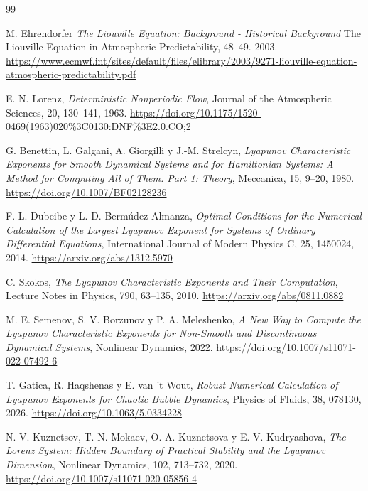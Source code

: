 \documentclass[12pt,a4paper,oneside]{report}
\numberwithin{equation}{chapter}
\begin{document}
\begin{thebibliography}{99}

 M. Ehrendorfer
\emph{The Liouville Equation: Background - Historical Background}
The Liouville Equation in Atmospheric Predictability, 48–49. 2003.
\url{https://www.ecmwf.int/sites/default/files/elibrary/2003/9271-liouville-equation-atmospheric-predictability.pdf}

 E. N. Lorenz, \emph{Deterministic Nonperiodic Flow}, Journal of the Atmospheric Sciences, 20, 130--141, 1963. \url{https://doi.org/10.1175/1520-0469(1963)020%3C0130:DNF%3E2.0.CO;2}

 G. Benettin, L. Galgani, A. Giorgilli y J.-M. Strelcyn, \emph{Lyapunov Characteristic Exponents for Smooth Dynamical Systems and for Hamiltonian Systems: A Method for Computing All of Them. Part 1: Theory}, Meccanica, 15, 9--20, 1980. \url{https://doi.org/10.1007/BF02128236}

 F. L. Dubeibe y L. D. Bermúdez-Almanza, \emph{Optimal Conditions for the Numerical Calculation of the Largest Lyapunov Exponent for Systems of Ordinary Differential Equations}, International Journal of Modern Physics C, 25, 1450024, 2014. \url{https://arxiv.org/abs/1312.5970}

 C. Skokos, \emph{The Lyapunov Characteristic Exponents and Their Computation}, Lecture Notes in Physics, 790, 63--135, 2010. \url{https://arxiv.org/abs/0811.0882}

 M. E. Semenov, S. V. Borzunov y P. A. Meleshenko, \emph{A New Way to Compute the Lyapunov Characteristic Exponents for Non-Smooth and Discontinuous Dynamical Systems}, Nonlinear Dynamics, 2022. \url{https://doi.org/10.1007/s11071-022-07492-6}

 T. Gatica, R. Haqshenas y E. van 't Wout, \emph{Robust Numerical Calculation of Lyapunov Exponents for Chaotic Bubble Dynamics}, Physics of Fluids, 38, 078130, 2026. \url{https://doi.org/10.1063/5.0334228}

 N. V. Kuznetsov, T. N. Mokaev, O. A. Kuznetsova y E. V. Kudryashova, \emph{The Lorenz System: Hidden Boundary of Practical Stability and the Lyapunov Dimension}, Nonlinear Dynamics, 102, 713--732, 2020. \url{https://doi.org/10.1007/s11071-020-05856-4}


\end{thebibliography}
\end{document}
